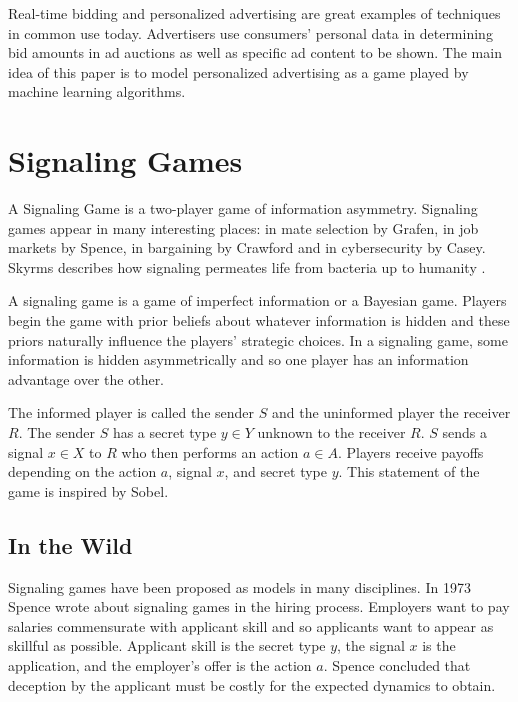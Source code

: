 \documentclass{article}
\begin{document}
Real-time bidding and personalized advertising are great examples of techniques in common use today. Advertisers use consumers' personal data in determining bid amounts in ad auctions as well as specific ad content to be shown. The main idea of this paper is to model personalized advertising as a game played by machine learning algorithms.

\section{Signaling Games}

A Signaling Game is a two-player game of information asymmetry. Signaling games appear in many interesting places: in mate selection by Grafen\cite{grafen1}, in job markets by Spence\cite{spence1973job}, in bargaining by Crawford\cite{crawford1982strategic} and in cybersecurity by Casey\cite{casey1}\cite{casey2}\cite{casey3}. Skyrms describes how signaling permeates life from bacteria up to humanity \cite{skyrms2010signals}.

A signaling game is a game of imperfect information or a Bayesian game\cite{harsanyi2004games}. Players begin the game with prior beliefs about whatever information is hidden and these priors naturally influence the players' strategic choices. In a signaling game, some information is hidden asymmetrically and so one player has an information advantage over the other. 

The informed player is called the sender $S$ and the uninformed player the receiver $R$. The sender $S$ has a secret type $y \in Y$ unknown to the receiver $R$. $S$ sends a signal $x \in X$ to $R$ who then performs an action $a \in A$. Players receive payoffs depending on the action $a$, signal $x$, and secret type $y$. This statement of the game is inspired by Sobel\cite{sobel1}.

\subsection{In the Wild}

Signaling games have been proposed as models in many disciplines. In 1973 Spence wrote about signaling games in the hiring process\cite{spence1973job}. Employers want to pay salaries commensurate with applicant skill and so applicants want to appear as skillful as possible. Applicant skill is the secret type $y$, the signal $x$ is the application, and the employer's offer is the action $a$. Spence concluded that deception by the applicant must be costly for the expected dynamics to obtain.
\end{document}
